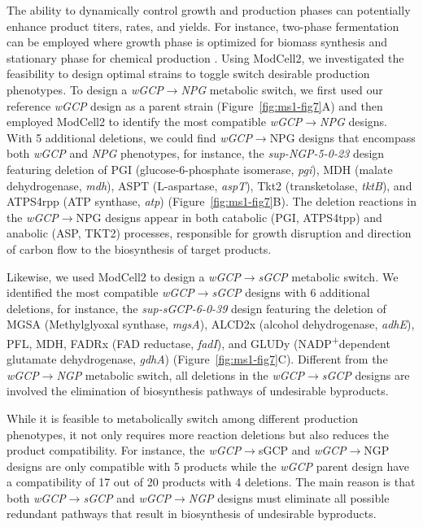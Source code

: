 The ability to dynamically control growth and production phases can potentially enhance product titers, rates, and yields.
For instance, two-phase fermentation can be employed where growth phase is optimized for biomass synthesis and stationary phase for chemical production \citep{klamt2018}.
Using ModCell2, we investigated the feasibility to design optimal strains to toggle switch desirable production phenotypes\emph{.}
To design a \emph{wGCP}$\rightarrow$\emph{NPG} metabolic switch, we first used our reference \emph{wGCP} design as a parent strain (Figure~\ref{fig:ms1-fig7}A) and then employed ModCell2 to identify the most compatible \emph{wGCP}$\rightarrow$\emph{NPG} designs.
With 5 additional deletions, we could find \emph{wGCP}$\rightarrow$NPG designs that encompass both \emph{wGCP} and \emph{NPG} phenotypes, for instance, the \emph{sup-NGP-5-0-23} design featuring deletion of PGI (glucose-6-phosphate isomerase, \emph{pgi}), MDH (malate dehydrogenase, \emph{mdh}), ASPT (L-aspartase, \emph{aspT}), Tkt2 (transketolase, \emph{tktB}), and ATPS4rpp (ATP synthase, \emph{atp}) (Figure~\ref{fig:ms1-fig7}B).
The deletion reactions in the \emph{wGCP}$\rightarrow$NPG designs appear in both catabolic (PGI, ATPS4tpp) and anabolic (ASP, TKT2) processes, responsible for growth disruption and direction of carbon flow to the biosynthesis of target products.

Likewise, we used ModCell2 to design a \emph{wGCP}$\rightarrow$\emph{sGCP} metabolic switch\emph{.} We identified the most compatible \emph{wGCP}$\rightarrow$\emph{sGCP} designs with 6 additional deletions, for instance, the \emph{sup-sGCP-6-0-39} design featuring the deletion of MGSA (Methylglyoxal synthase, \emph{mgsA}), ALCD2x (alcohol dehydrogenase, \emph{adhE}), PFL, MDH, FADRx (FAD reductase, \emph{fadI}), and GLUDy (NADP\textsuperscript{+}dependent glutamate dehydrogenase, \emph{gdhA}) (Figure~\ref{fig:ms1-fig7}C).
Different from the \emph{wGCP}$\rightarrow$\emph{NGP} metabolic switch, all deletions in the \emph{wGCP}$\rightarrow$\emph{sGCP} designs are involved the elimination of biosynthesis pathways of undesirable byproducts.

While it is feasible to metabolically switch among different production phenotypes, it not only requires more reaction deletions but also reduces the product compatibility.
For instance, the \emph{wGCP}$\rightarrow$sGCP and \emph{wGCP}$\rightarrow$NGP designs are only compatible with 5 products while the \emph{wGCP} parent design have a compatibility of 17 out of 20 products with 4 deletions.
The main reason is that both \emph{wGCP}$\rightarrow$\emph{sGCP} and \emph{wGCP}$\rightarrow$\emph{NGP} designs must eliminate all possible redundant pathways that result in biosynthesis of undesirable byproducts.


